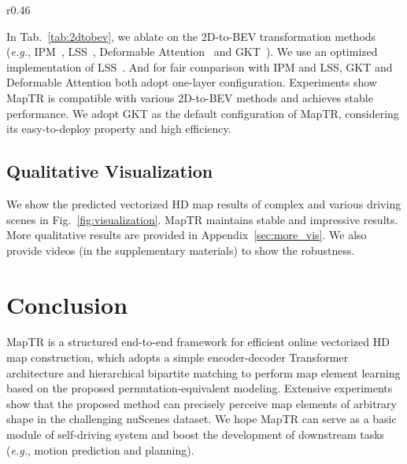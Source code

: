 \documentclass{article} \usepackage{iclr2023_conference,times}
\def\eg{\emph{e.g.}} \def\Eg{\emph{E.g.}}
\begin{document}
\begin{wraptable}{r}{0.46\linewidth}
\vspace{-1.5em}
\centering
{}
\vspace*{-0.25cm}
\caption{Ablations about 2D-to-BEV transformation methods.  MapTR is compatible with various 2D-to-BEV methods and achieves stable performance.}
\label{tab:2dtobev}
\vspace{-1em}
\end{wraptable}
\vspace{-1em}\vspace{-\parskip}
In Tab.~\ref{tab:2dtobev}, we ablate on the 2D-to-BEV transformation methods  (\eg, IPM~\citep{ipm}, LSS~\citep{liu2022bevfusion,lss}, Deformable Attention~\citep{bevformer} and GKT~\citep{gkt}). We use an optimized implementation of LSS~\citep{liu2022bevfusion}. And for fair comparison with IPM and LSS, GKT and Deformable Attention both adopt one-layer configuration.
Experiments show MapTR is compatible with various 2D-to-BEV methods and achieves stable performance. We adopt GKT as the default configuration of MapTR, considering its easy-to-deploy property and high efficiency.



\vspace*{-0.15cm}
\subsection{Qualitative Visualization}
We show the predicted vectorized HD map results of complex and various driving scenes in Fig.~\ref{fig:visualization}. MapTR maintains stable and impressive results. More qualitative results are provided in Appendix~\ref{sec:more_vis}. We also provide videos (in the supplementary materials) to show the robustness.




\section{Conclusion}
MapTR is a structured end-to-end framework for efficient online vectorized HD map construction, which  adopts a simple encoder-decoder Transformer architecture and hierarchical bipartite matching to perform map element learning based on the proposed permutation-equivalent modeling.
Extensive experiments show that the proposed method can precisely perceive  map elements of arbitrary shape in the challenging nuScenes dataset. We hope MapTR can serve as a basic module of self-driving system and boost the development of downstream tasks (\eg, motion prediction and planning).
\end{document}

